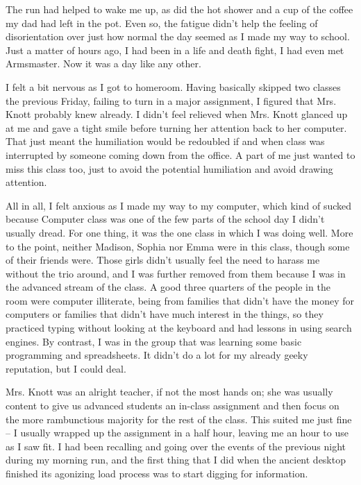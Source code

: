 





The run had helped to wake me up, as did the hot shower and a cup of the coffee my dad had left in the pot.  Even so, the fatigue didn't help the feeling of disorientation over just how normal the day seemed as I made my way to school.  Just a matter of hours ago, I had been in a life and death fight, I had even met Armsmaster.  Now it was a day like any other.



I felt a bit nervous as I got to homeroom.  Having basically skipped two classes the previous Friday, failing to turn in a major assignment, I figured that Mrs. Knott probably knew already.  I didn't feel relieved when Mrs. Knott glanced up at me and gave a tight smile before turning her attention back to her computer.  That just meant the humiliation would be redoubled if and when class was interrupted by someone coming down from the office.  A part of me just wanted to miss this class too, just to avoid the potential humiliation and avoid drawing attention.



All in all, I felt anxious as I made my way to my computer, which kind of sucked because Computer class was one of the few parts of the school day I didn't usually dread.  For one thing, it was the one class in which I was doing well.  More to the point, neither Madison, Sophia nor Emma were in this class, though some of their friends were.  Those girls didn't usually feel the need to harass me without the trio around, and I was further removed from them because I was in the advanced stream of the class.  A good three quarters of the people in the room were computer illiterate, being from families that didn't have the money for computers or families that didn't have much interest in the things, so they practiced typing without looking at the keyboard and had lessons in using search engines.  By contrast, I was in the group that was learning some basic programming and spreadsheets.  It didn't do a lot for my already geeky reputation, but I could deal.



Mrs. Knott was an alright teacher, if not the most hands on; she was usually content to give us advanced students an in-class assignment and then focus on the more rambunctious majority for the rest of the class.  This suited me just fine – I usually wrapped up the assignment in a half hour, leaving me an hour to use as I saw fit.  I had been recalling and going over the events of the previous night during my morning run, and the first thing that I did when the ancient desktop finished its agonizing load process was to start digging for information.



